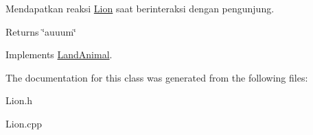 Mendapatkan reaksi \hyperlink{classLion}{Lion} saat berinteraksi dengan pengunjung. 

\begin{DoxyReturn}{Returns}
\char`\"{}auuum\char`\"{} 
\end{DoxyReturn}


Implements \hyperlink{classLandAnimal}{Land\-Animal}.



The documentation for this class was generated from the following files\-:\begin{DoxyCompactItemize}
\item 
Lion.\-h\item 
Lion.\-cpp\end{DoxyCompactItemize}
